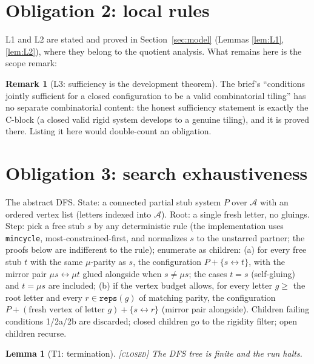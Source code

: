 \documentclass[11pt]{article}
\newtheorem{lemma}[theorem]{Lemma}
\theoremstyle{definition}
\newtheorem{remark}[theorem]{Remark}
\newcommand{\CLOSED}{\textnormal{\textsc{[closed]}}}
\newcommand{\A}{\mathcal{A}}
\begin{document}
\section{Obligation 2: local rules}\label{sec:local}

L1 and L2 are stated and proved in Section~\ref{sec:model} (Lemmas \ref{lem:L1},
\ref{lem:L2}), where they belong to the quotient analysis. What remains here is the
scope remark:

\begin{remark}[L3: sufficiency is the development theorem]
The brief's ``conditions jointly sufficient for a closed configuration to be a valid
combinatorial tiling'' has no separate combinatorial content: the honest sufficiency
statement is exactly the C-block (a closed valid rigid system develops to a genuine
tiling), and it is proved there. Listing it here would double-count an obligation.
\end{remark}

\section{Obligation 3: search exhaustiveness}\label{sec:search}

The abstract DFS. State: a connected partial stub system $P$ over $\A$ with an ordered
vertex list (letters indexed into $\A$). Root: a single fresh letter, no gluings. Step:
pick a free stub $s$ by any deterministic rule (the implementation uses
\texttt{mincycle}, most-constrained-first, and normalizes $s$ to the unstarred partner;
the proofs below are indifferent to the rule); enumerate as children:
(a) for every free stub $t$ with the same $\mu$-parity as $s$, the configuration
$P + \{s \leftrightarrow t\}$, with the mirror pair $\mu s \leftrightarrow \mu t$ glued
alongside when $s \ne \mu s$; the cases $t = s$ (self-gluing) and $t = \mu s$ are
included;
(b) if the vertex budget allows, for every letter $g \ge$ the root letter and every
$r \in \texttt{reps}(g)$ of matching parity, the configuration
$P + (\text{fresh vertex of letter } g) + \{s \leftrightarrow r\}$ (mirror pair
alongside).
Children failing conditions 1/2a/2b are discarded; closed children go to the rigidity
filter; open children recurse.

\begin{lemma}[T1: termination]\label{lem:T1} \CLOSED\;
The DFS tree is finite and the run halts.
\end{lemma}
\end{document}
